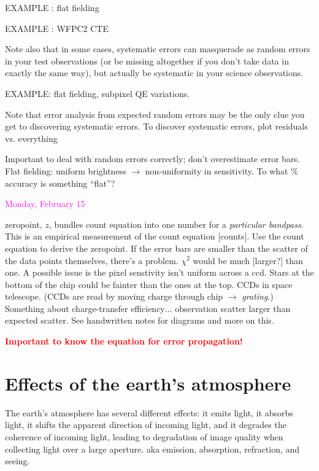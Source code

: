 \documentclass[12pt]{article}
\begin{document}
EXAMPLE : flat fielding

EXAMPLE : WFPC2 CTE

Note also that in some cases, systematic errors can masquerade as
random errors in your test observations (or be missing altogether if
you don't take data in exactly the same way), but actually be
systematic in your science observations.

EXAMPLE: flat fielding, subpixel QE variations.

Note that error analysis from expected random errors may be the only
clue you get to discovering systematic errors. To discover systematic
errors, plot residuals vs. everything

\textcolor{myBlue}{Important to deal with random errors correctly;
    don't overestimate error bars.
    Flat fielding: uniform brightness $\rightarrow$ non-uniformity in
    sensitivity. To what \% accuracy is something ``flat''?
}

\textcolor{magenta}{Monday, February 15}

\textcolor{myBlue}{zeropoint, $z$, bundles count equation into one
    number for a \emph{particular bandpass}. This is an empirical
    measurement of the count equation [counts]. Use the count
    equation to derive the zeropoint.
    If the error bars are smaller than the scatter of the data points
    themselves, there's a problem. $\chi^2$ would be much [larger?]
    than one.
    A possible issue is the pixel senstivity isn't uniform across a
    ccd. Stars at the bottom of the chip could be fainter than the
    ones at the top. CCDs in space telescope. (CCDs are read
    by moving charge through chip $\rightarrow$ \emph{grating}.)
    Something about charge-transfer efficiency$\ldots$ observation
    scatter larger than expected scatter.
    See handwritten notes for diagrams and more on this.
}

\textcolor{red}{\textbf{Important to know the equation for error
propagation!}
}

\section*{Effects of the earth's atmosphere}

The earth's atmosphere has several different effects: it emits light,
it absorbs light, it shifts the apparent direction of incoming light,
and it degrades the coherence of incoming light, leading to
degradation of image quality when collecting light over a large
aperture. \textcolor{myBlue}{aka emission, absorption, refraction, and
seeing}.
\end{document}
